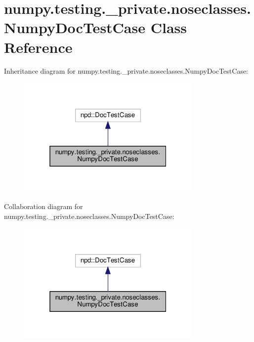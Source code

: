 \hypertarget{classnumpy_1_1testing_1_1__private_1_1noseclasses_1_1NumpyDocTestCase}{}\section{numpy.\+testing.\+\_\+private.\+noseclasses.\+Numpy\+Doc\+Test\+Case Class Reference}
\label{classnumpy_1_1testing_1_1__private_1_1noseclasses_1_1NumpyDocTestCase}


Inheritance diagram for numpy.\+testing.\+\_\+private.\+noseclasses.\+Numpy\+Doc\+Test\+Case\+:
\nopagebreak
\begin{figure}[H]
\begin{center}
\leavevmode
\includegraphics[width=256pt]{classnumpy_1_1testing_1_1__private_1_1noseclasses_1_1NumpyDocTestCase__inherit__graph}
\end{center}
\end{figure}


Collaboration diagram for numpy.\+testing.\+\_\+private.\+noseclasses.\+Numpy\+Doc\+Test\+Case\+:
\nopagebreak
\begin{figure}[H]
\begin{center}
\leavevmode
\includegraphics[width=256pt]{classnumpy_1_1testing_1_1__private_1_1noseclasses_1_1NumpyDocTestCase__coll__graph}
\end{center}
\end{figure}

